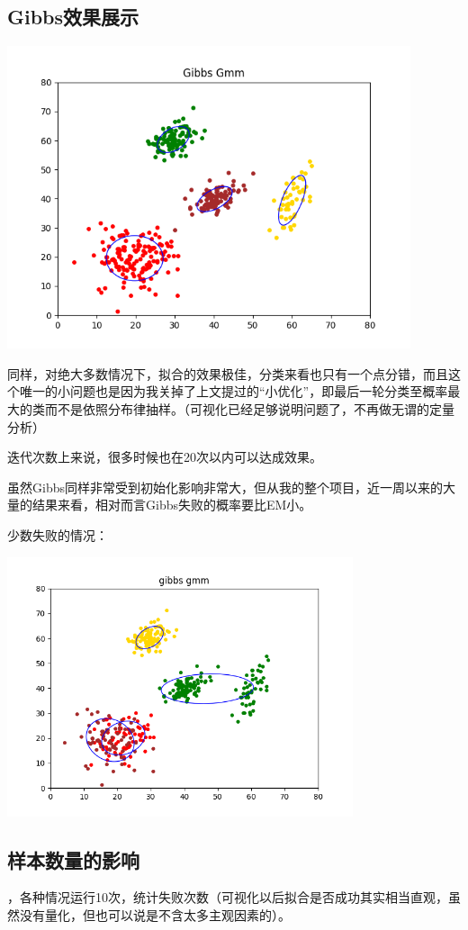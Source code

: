 \documentclass[hyperref,UTF8]{ctexart}
\begin{document}
\subsection*{Gibbs效果展示}
\centerline{\includegraphics[height=3.5in]{exp-results/Gibbs_rand4.png}}
\par 同样，对绝大多数情况下，拟合的效果极佳，分类来看也只有一个点分错，而且这个唯一的小问题也是因为我关掉了上文提过的“小优化”，即最后一轮分类至概率最大的类而不是依照分布律抽样。（可视化已经足够说明问题了，不再做无谓的定量分析）
\par 迭代次数上来说，很多时候也在20次以内可以达成效果。
\par 虽然Gibbs同样非常受到初始化影响非常大，但从我的整个项目，近一周以来的大量的结果来看，相对而言Gibbs失败的概率要比EM小。
\par 少数失败的情况：\\
\centerline{\includegraphics[height=3in]{exp-results/Gibbs_fail.png}}


\subsection*{样本数量的影响}
，各种情况运行10次，统计失败次数（可视化以后拟合是否成功其实相当直观，虽然没有量化，但也可以说是不含太多主观因素的）。
\end{document}
